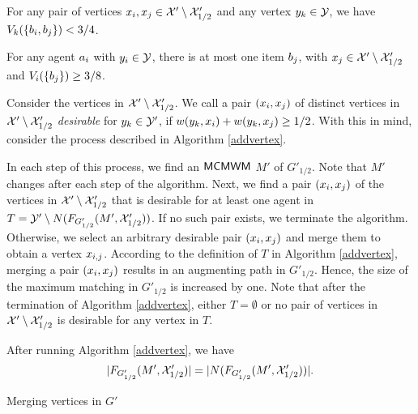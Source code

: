 \begin{lemma}
\label{pairsmall}
 For any pair of vertices $x_i , x_j \in \mathcal{X}' \setminus \mathcal{X}'_{1/2}$ and any vertex $y_k \in \mathcal{Y}$, we have $V_k(\{b_i,b_j\}) < {3/4}$.
\end{lemma}

\begin{corollary} 
\label{forc2small}
For any agent $a_i$ with $y_i \in \mathcal{Y}$, there is at most one item $b_j$, with $x_j \in \mathcal{X}' \setminus \mathcal{X}'_{1/2}$ and $V_i(\{b_j\}) \geq {3/8}$.
\end{corollary}

Consider the vertices in $\mathcal{X}' \setminus \mathcal{X}'_{1/2}$. We call a pair $(x_i,x_j)$ of distinct vertices in $\mathcal{X}' \setminus \mathcal{X}'_{1/2}$ \textit{desirable} for $y_k \in \mathcal{Y}'$, if $w(y_k,x_i) + w(y_k,x_j) \geq {1/2}$. With this in mind, consider the process described in Algorithm \ref{addvertex}. 

In each step of this process, we find an $\textsf{MCMWM}$ $M'$ of $G'_{1/2}$. Note that $M'$ changes after each step of the algorithm. Next, we find a pair $(x_i,x_j)$ of the vertices in $\mathcal{X}' \setminus \mathcal{X}'_{1/2}$ that is desirable for at least one agent in $T = \mathcal{Y}' \setminus N(F_{G'_{1/2}}(M',\mathcal{X}'_{1/2}))$. If no such pair exists, we terminate the algorithm. Otherwise, we select an arbitrary desirable pair $(x_i,x_j)$ and merge them to obtain a vertex $x_{i,j}$. According to the definition of $T$ in Algorithm \ref{addvertex}, merging a pair  $(x_i,x_j)$ results in an augmenting path in $G'_{1/2}$. Hence, the size of the maximum matching in $G'_{1/2}$ is increased by one. Note that after the termination of Algorithm \ref{addvertex}, either $T = \emptyset$ or  no pair of vertices in $\mathcal{X}' \setminus \mathcal{X}'_{1/2}$ is desirable for any vertex in $T$. 

\begin{lemma} 
\label{sizeeq}
After running Algorithm \ref{addvertex}, we have
$$|F_{G'_{1/2}}(M',\mathcal{X}'_{1/2})| = |N(F_{G'_{1/2}}(M',\mathcal{X}'_{1/2}))|.$$  
\end{lemma}

\begin{algorithm}[t!]
 \caption{Merging vertices in $G'$}
 \label{addvertex}
\end{algorithm}

